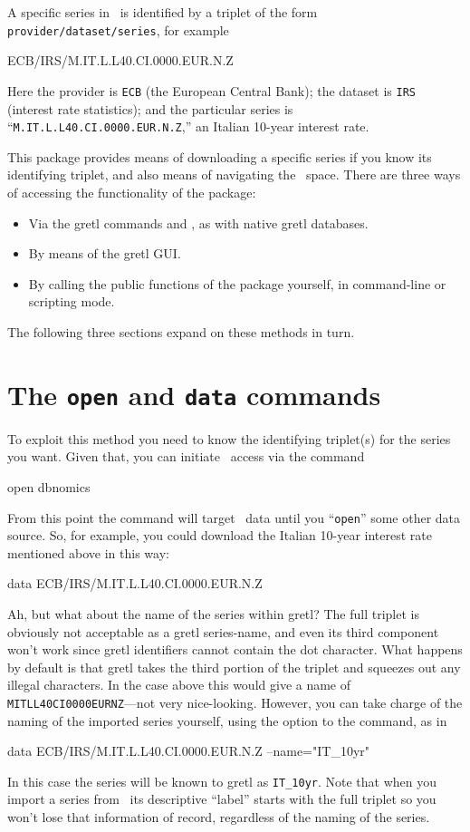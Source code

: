 \documentclass{article}
\begin{document}
A specific series in \DB\ is identified by a triplet
of the form \texttt{provider/dataset/series}, for example
\begin{code}
ECB/IRS/M.IT.L.L40.CI.0000.EUR.N.Z
\end{code}
Here the provider is \texttt{ECB} (the European Central Bank); the
dataset is \texttt{IRS} (interest rate statistics); and the particular
series is ``\texttt{M.IT.L.L40.CI.0000.EUR.N.Z},'' an Italian 10-year
interest rate.

This package provides means of downloading a specific series if you
know its identifying triplet, and also means of navigating the
\DB\ space. There are three ways of accessing the
functionality of the package:
\begin{itemize}
\item Via the gretl commands  and , as with native
  gretl databases.
\item By means of the gretl GUI.
\item By calling the public functions of the package yourself, in
  command-line or scripting mode.
\end{itemize}
The following three sections expand on these methods in turn.

\section{The \texttt{open} and \texttt{data} commands}
\label{sec:open-data}

To exploit this method you need to know the identifying triplet(s) for
the series you want. Given that, you can initiate \DB\ 
access via the command
\begin{code}
open dbnomics
\end{code}
From this point the  command will target \DB\ 
data until you ``\texttt{open}'' some other data source. So, for
example, you could download the Italian 10-year interest rate
mentioned above in this way:
\begin{code}
data ECB/IRS/M.IT.L.L40.CI.0000.EUR.N.Z
\end{code}
Ah, but what about the name of the series within gretl? The full
triplet is obviously not acceptable as a gretl series-name, and even
its third component won't work since gretl identifiers cannot contain
the dot character. What happens by default is that gretl takes the
third portion of the triplet and squeezes out any illegal characters.
In the case above this would give a name of
\texttt{MITLL40CI0000EURNZ}---not very nice-looking. However, you can
take charge of the naming of the imported series yourself, using the
\option{name} option to the \cmd{data} command, as in
\begin{code}
data ECB/IRS/M.IT.L.L40.CI.0000.EUR.N.Z --name="IT_10yr"
\end{code}
In this case the series will be known to gretl as \texttt{IT\_10yr}.
Note that when you import a series from \DB\ its
descriptive ``label'' starts with the full triplet so you won't lose
that information of record, regardless of the naming of the series.
\end{document}
